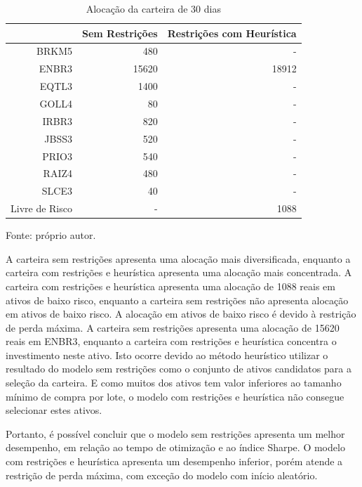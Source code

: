         \begin{table}[htbp]
            \centering
            \caption{Alocação da carteira de 30 dias}
            \label{tab:distribuicao_carteira_30}
            \begin{tabular}{rrr}
                \hline
                & Sem Restrições & Restrições com Heurística \\
                \hline\hline
               BRKM5 & 480 & - \\
               ENBR3 & 15620 & 18912 \\
               EQTL3 & 1400 & - \\
               GOLL4 & 80 & - \\
               IRBR3 & 820 & - \\
               JBSS3 & 520 & - \\
               PRIO3 & 540 & - \\
               RAIZ4 & 480 & - \\
               SLCE3 & 40 & - \\
               Livre de Risco & - & 1088 \\
               \hline
            \end{tabular}
            \par \footnotesize Fonte: próprio autor. 
        \end{table}

        \ipar A carteira sem restrições apresenta uma alocação mais diversificada, enquanto a carteira com restrições e heurística apresenta uma alocação mais concentrada. A carteira com restrições e heurística apresenta uma alocação de 1088 reais em ativos de baixo risco, enquanto a carteira sem restrições não apresenta alocação em ativos de baixo risco. A alocação em ativos de baixo risco é devido à restrição de perda máxima. A carteira sem restrições apresenta uma alocação de 15620 reais em ENBR3, enquanto a carteira com restrições e heurística concentra o investimento neste ativo. Isto ocorre devido ao método heurístico utilizar o resultado do modelo sem restrições como o conjunto de ativos candidatos para a seleção da carteira. E como muitos dos ativos tem valor inferiores ao tamanho mínimo de compra por lote, o modelo com restrições e heurística não consegue selecionar estes ativos.

        \ipar Portanto, é possível concluir que o modelo sem restrições apresenta um melhor desempenho, em relação ao tempo de otimização e ao índice Sharpe. O modelo com restrições e heurística apresenta um desempenho inferior, porém atende a restrição de perda máxima, com exceção do modelo com início aleatório.
        

